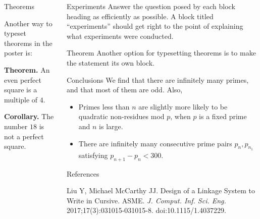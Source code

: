 \documentclass{beamer}
\begin{document}
\begin{frame}{}
\begin{columns}[t]
\begin{column}{0.245\linewidth}
\begin{block}{Theorems}
\vspace{1em}

Another way to typeset theorems in the poster is:

\vspace{1em}

\textbf{Theorem.}  An even perfect square is a multiple of $4$.

\vspace{0.5em}

\textbf{Corollary.}  The number $18$ is not a perfect square.
\end{block}

\end{column}%


\begin{column}{0.245\linewidth}

\begin{block}{Experiments}
Answer the question posed by each block heading as efficiently as
possible.  A block titled ``experiments'' should get right to the
point of explaining what experiments were conducted.
\end{block}

\begin{block}{Theorem}
Another option for typesetting theorems is to make the statement its
own block.
\end{block}

\begin{block}{Conclusions}
We find that there are infinitely many primes, and that most of them
are odd.  Also,
\begin{itemize}
\item Primes less than $n$ are slightly more likely to be quadratic
non-residues mod $p$, when $p$ is a fixed prime and $n$ is large.
\item There are infinitely many consecutive prime pairs $p_n, p_{n_1}$
satisfying $p_{n+1} - p_n < 300$.
\end{itemize}
\end{block}

\begin{block}{References}
\begin{thebibliography}{99}

Liu Y, Michael McCarthy JJ. Design of a Linkage System to Write in Cursive. ASME. \emph{J. Comput. Inf. Sci. Eng.} 2017;17(3):031015-031015-8. doi:10.1115/1.4037229.


\end{thebibliography}
\end{block}
\end{column}
\end{columns}
\end{frame}
\end{document}
